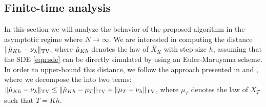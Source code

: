 
\subsection{Finite-time analysis}

\newcommand{\minvsp}{-5}

In this section we will analyze the behavior of the proposed algorithm in the asymptotic regime where $N \rightarrow \infty$. We are interested in computing the distance $\| \hat{\mu}_{Kh} - \nu_\lambda \|_{\textnormal{TV}}$, where $\hat{\mu}_{Kh}$ denotes the law of $\bar{X}_K$ with step size $h$, assuming that the SDE \eqref{eqn:sde} can be directly simulated by using an Euler-Maruyama scheme. In order to upper-bound this distance, we follow the approach presented in \cite{dalalyan2017theoretical} and \cite{raginsky17a}, where we decompose the into two terms: $\| \hat{\mu}_{Kh} - \nu_\lambda \|_{\textnormal{TV}} \leq \| \hat{\mu}_{Kh} - \mu_T \|_{\textnormal{TV}} + \| \mu_{T} - \nu_\lambda \|_{\textnormal{TV}}$, where $\mu_T$ denotes the law of $X_T$ such that $T=Kh$.


